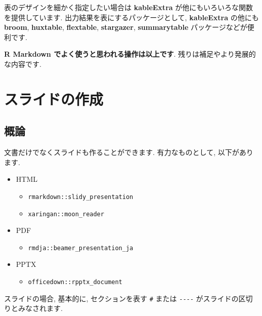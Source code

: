 \documentclass[
]{ltjsarticle}
\providecommand{\tightlist}{%
  \setlength{\itemsep}{0pt}\setlength{\parskip}{0pt}}
\newenvironment{infobox}[1]{\begin{itemize}\renewcommand{\labelitemi}{\raisebox{-.7\height}[0pt][0pt]{%
  {\setkeys{Gin}{width=3em,keepaspectratio}\texttt{[image: \_latex/\_img/\#1]}}}}
  \setlength{\fboxsep}{1em}
  \begin{greyblock}
  \item
  }{\end{greyblock}\end{itemize}
}
\begin{document}
表のデザインを細かく指定したい場合は \textbf{kableExtra} が他にもいろいろな関数を提供しています. 出力結果を表にするパッケージとして, \textbf{kableExtra} の他にも \textbf{broom}, \textbf{huxtable}, \textbf{flextable}, \textbf{stargazer}, \textbf{summarytable} パッケージなどが便利です.

\begin{infobox}{important}
\textbf{R Markdown でよく使うと思われる操作は以上です}. 残りは補足やより発展的な内容です.

\end{infobox}

\hypertarget{slides}{%
\section{スライドの作成}\label{slides}}

\hypertarget{ux6982ux8ad6}{%
\subsection{概論}\label{ux6982ux8ad6}}

文書だけでなくスライドも作ることができます. 有力なものとして, 以下があります.

\begin{itemize}
\tightlist
\item
  HTML

  \begin{itemize}
  \tightlist
  \item
    \texttt{rmarkdown::slidy\_presentation}
  \item
    \texttt{xaringan::moon\_reader}
  \end{itemize}
\item
  PDF

  \begin{itemize}
  \tightlist
  \item
    \texttt{rmdja::beamer\_presentation\_ja}
  \end{itemize}
\item
  PPTX

  \begin{itemize}
  \tightlist
  \item
    \texttt{officedown::rpptx\_document}
  \end{itemize}
\end{itemize}

スライドの場合, 基本的に, セクションを表す \texttt{\#} または \texttt{-\/-\/-\/-} がスライドの区切りとみなされます.
\end{document}
